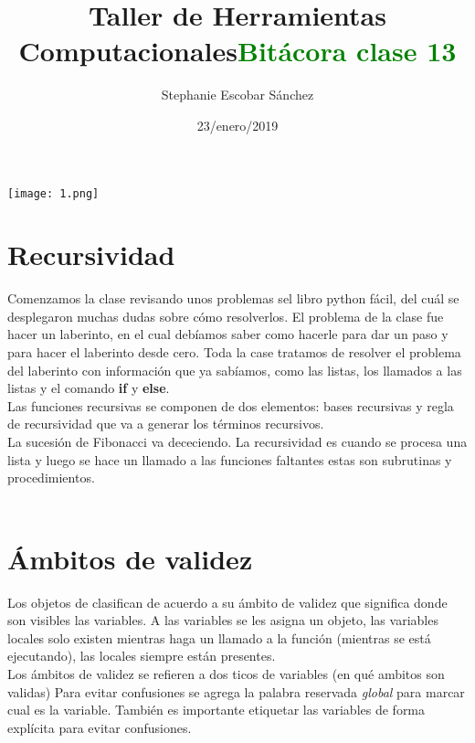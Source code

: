 \documentclass{article}
\title{\Huge Taller de Herramientas Computacionales}
\author{Stephanie Escobar Sánchez}
\date{23/enero/2019}
\begin{document}
	\maketitle
	\begin{center}
		\texttt{[image: 1.png]}	
	\end{center}
	\newpage
	\begin{center}
		\title {\textcolor{green}{\Huge \textbf{Bitácora clase 13}} }  
	\end{center}

\section{Recursividad}

Comenzamos la clase revisando unos problemas sel libro python fácil, del cuál se desplegaron muchas dudas sobre cómo resolverlos. El problema de la clase fue hacer un laberinto, en el cual debíamos saber como hacerle para dar un paso y para hacer el laberinto desde cero. Toda la case tratamos de resolver el problema del laberinto con información que ya sabíamos, como las listas, los llamados a las listas y el comando \textbf{if} y \textbf{else}.\\

Las funciones recursivas se componen de dos elementos: bases recursivas y regla de recursividad que va a generar los términos recursivos.\\
La sucesión de Fibonacci va dececiendo.
La recursividad es cuando se procesa una lista y luego se hace un llamado a las funciones faltantes estas son subrutinas y procedimientos.\\
\\
\section{Ámbitos de validez}

Los objetos de clasifican de acuerdo a su ámbito de validez que significa donde son visibles las variables. A las variables se les asigna un objeto, las variables locales solo existen mientras haga un llamado a la función (mientras se está ejecutando), las locales siempre están presentes.\\
Los ámbitos de validez se refieren a dos ticos de variables (en qué ambitos son validas)
Para evitar confusiones se agrega la palabra reservada \textit{global} para marcar cual es la variable.
También es importante etiquetar las variables de forma explícita para evitar confusiones.
\end{document}
